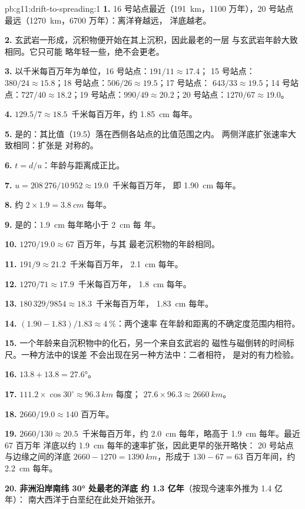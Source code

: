 \begin{solution}{pb:g11:drift-to-spreading:1}
\textbf{1.} 16 号站点最近（\qty{191}{km}，1100 万年），20 号站点
最远（\qty{1270}{km}，6700 万年）：离洋脊越远，
洋底越老。

\textbf{2.} 玄武岩一形成，沉积物便开始在其上沉积，因此最老的一层
与玄武岩年龄大致相同。它只可能
略年轻一些，绝不会更老。

\textbf{3.} 以千米每百万年为单位，16 号站点：$191/11 \approx 17.4$；
15 号站点：$380/24 \approx 15.8$；18 号站点：$506/26 \approx 19.5$；17 号站点：
$643/33 \approx 19.5$；14 号站点：$727/40 \approx 18.2$；19 号站点：$990/49
\approx 20.2$；20 号站点：$1270/67 \approx 19.0$。

\textbf{4.} $129.5/7 \approx \num{18.5}$~千米每百万年，约
\qty{1.85}{cm} 每年。

\textbf{5.} 是的：其比值（19.5）落在西侧各站点的比值范围之内。
两侧洋底扩张速率大致相同：扩张是
对称的。

\textbf{6.} $t = d/u$：年龄与距离成正比。

\textbf{7.} $u = 208\,276/10\,952 \approx \num{19.0}$~千米每百万年，
即 \qty{1.90}{cm} 每年。

\textbf{8.} 约 $2 \times 1.9 = \qty{3.8}{cm}$ 每年。

\textbf{9.} 是的：\qty{1.9}{cm} 每年略小于 \qty{2}{cm} 每
年。

\textbf{10.} $1270/19.0 \approx 67$ 百万年，与其
最老沉积物的年龄相同。

\textbf{11.} $191/9 \approx \num{21.2}$~千米每百万年，
\qty{2.1}{cm} 每年。

\textbf{12.} $1270/71 \approx \num{17.9}$~千米每百万年，
\qty{1.8}{cm} 每年。

\textbf{13.} $180\,329/9854 \approx \num{18.3}$~千米每百万年，
\qty{1.83}{cm} 每年。

\textbf{14.} $(1.90 - 1.83)/1.83 \approx \qty{4}{\percent}$：两个速率
在年龄和距离的不确定度范围内相符。

\textbf{15.} 一个年龄来自沉积物中的化石，另一个来自玄武岩的
磁性与磁倒转的时间标尺。一种方法中的误差
不会出现在另一种方法中：二者相符，
是对的有力检验。

\textbf{16.} $13.8 + 13.8 = \ang{27.6}$。

\textbf{17.} $111.2 \times \cos 30^\circ \approx \qty{96.3}{km}$ 每度；
$27.6 \times 96.3 \approx \qty{2660}{km}$。

\textbf{18.} $2660/19.0 \approx 140$ 百万年。

\textbf{19.} $2660/130 \approx \num{20.5}$~千米每百万年，约
\qty{2.0}{cm} 每年，略高于 \qty{1.9}{cm} 每年。最近 67 百万年
洋底以约 \qty{1.9}{cm} 每年的速率扩张，因此更早的张开略快：
20 号站点与边缘之间的洋底 $2660 - 1270 =
\qty{1390}{km}$，形成于 $130 - 67 = 63$ 百万年间，约
\qty{2.2}{cm} 每年。

\textbf{20.} \textbf{非洲沿岸南纬 \ang{30} 处最老的洋底
约 1.3 亿年}（按现今速率外推为 1.4 亿年）：
南大西洋于白垩纪在此处开始张开。
\end{solution}
